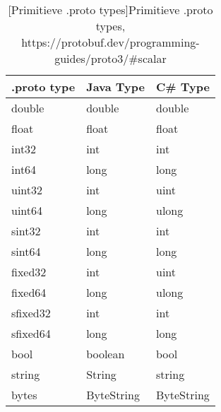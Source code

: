 \begin{table}
    \centering
    \begin{tabular}{lll}
        \toprule
        \textbf{.proto type} & \textbf{Java Type} & \textbf{C\# Type} \\
        \midrule
        double               & double             & double            \\
        float                & float              & float             \\
        int32                & int                & int               \\
        int64                & long               & long              \\
        uint32               & int                & uint              \\
        uint64               & long               & ulong             \\
        sint32               & int                & int               \\
        sint64               & long               & long              \\
        fixed32              & int                & uint              \\
        fixed64              & long               & ulong             \\
        sfixed32             & int                & int               \\
        sfixed64             & long               & long              \\
        bool                 & boolean            & bool              \\
        string               & String             & string            \\
        bytes                & ByteString         & ByteString        \\
        \bottomrule
    \end{tabular}
    \caption{[Primitieve .proto types]Primitieve .proto types,\newline
    https://protobuf.dev/programming-guides/proto3/\#scalar}
    \label{tab:Types}
\end{table}

